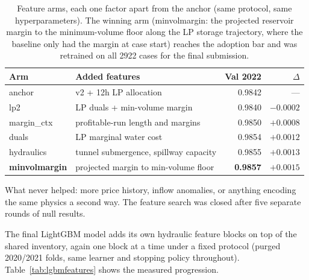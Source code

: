 \documentclass{article}
\begin{document}
\begin{table}[h]
    \centering
    \begin{tabular}{llrr}
        \hline
        Arm & Added features & Val 2022 & $\Delta$ \\
        \hline
        anchor & v2 + 12h LP allocation & 0.9842 & --- \\
        lp2 & LP duals + min-volume margin & 0.9840 & $-0.0002$ \\
        margin\_ctx & profitable-run length and margins & 0.9850 & $+0.0008$ \\
        duals & LP marginal water cost & 0.9854 & $+0.0012$ \\
        hydraulics & tunnel submergence, spillway capacity & 0.9855 & $+0.0013$ \\
        \textbf{minvolmargin} & projected margin to min-volume floor & \textbf{0.9857} & $+0.0015$ \\
        \hline
    \end{tabular}
    \caption{Feature arms, each one factor apart from the anchor (same
    protocol, same hyperparameters). The winning arm (minvolmargin: the
    projected reservoir margin to the minimum-volume floor along the LP
    storage trajectory, where the baseline only had the margin at case
    start) reaches the adoption bar and was retrained on all 2922 cases
    for the final submission.}
    \label{tab:arms}
\end{table}

What never helped: more price history, inflow anomalies, or anything
encoding the same physics a second way. The feature search was closed
after five separate rounds of null results.

The final LightGBM model adds its own hydraulic feature blocks on top of
the shared inventory, again one block at a time under a fixed protocol
(purged 2020/2021 folds, same learner and stopping policy throughout).
Table~\ref{tab:lgbmfeatures} shows the measured progression.
\end{document}
